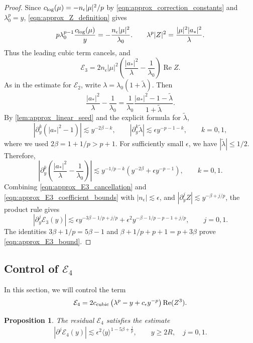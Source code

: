 \documentclass[11pt]{amsart}
\newtheorem{proposition}[theorem]{Proposition}
\theoremstyle{definition}
\theoremstyle{remark}
\numberwithin{equation}{section}
\newcommand{\sq}[1]{\widetilde{#1}}
\newcommand{\mc}[1]{\mathcal{#1}}
\newcommand{\ang}[1]{\langle #1 \rangle}
\begin{document}
\begin{proof}
    Since $c_{\textup{log}}(\mu)=-n_\epsilon|\mu|^2/p$ by \eqref{eqn:approx_correction_constants} and $\lambda_0^p=y$, \eqref{eqn:approx_Z_definition} gives
    \[p\lambda_0^{p-1}\frac{c_{\textup{log}}(\mu)}{y}
      =-\frac{n_\epsilon|\mu|^2}{\lambda_0}.
      \qquad
      \lambda^p|Z|^2=\frac{|\mu|^2|a_*|^2}{\lambda}.\]
    Thus the leading cubic term cancels, and
    \begin{equation}\label{eqn:approx_E3_cancellation}
        \mc{E}_3=2n_\epsilon|\mu|^2
        \left(\frac{|a_*|^2}{\lambda}-\frac{1}{\lambda_0}\right)
        \operatorname{Re}Z.
    \end{equation}
    As in the estimate for $\mc{E}_2$, write $\lambda=\lambda_0(1+\sq{\lambda})$. Then
    \[\frac{|a_*|^2}{\lambda}-\frac{1}{\lambda_0}
      =\frac{1}{\lambda_0}\frac{|a_*|^2-1-\sq{\lambda}}{1+\sq{\lambda}}.\]
    By \cref{lem:approx_linear_seed} and the explicit formula for $\sq{\lambda}$,
    \[|\partial_y^k(|a_*|^2-1)|\lesssim y^{-2\beta-k},\qquad
      |\partial_y^k\sq{\lambda}|\lesssim\epsilon y^{-p-1-k},\qquad k=0,1,\]
    where we used $2\beta=1+1/p>p+1$. For sufficiently small $\epsilon$, we have $|\sq{\lambda}|\leq1/2$. Therefore,
    \begin{equation}\label{eqn:approx_E3_coefficient_bounds}
        \left|\partial_y^k\left(\frac{|a_*|^2}{\lambda}-\frac{1}{\lambda_0}\right)\right|
        \lesssim y^{-1/p-k}\left(y^{-2\beta}+\epsilon y^{-p-1}\right),
        \qquad k=0,1.
    \end{equation}
    Combining \eqref{eqn:approx_E3_cancellation} and \eqref{eqn:approx_E3_coefficient_bounds} with $|n_\epsilon|\lesssim\epsilon$, and $|\partial_y^jZ|\lesssim y^{-\beta+j/p}$, the product rule gives
    \[|\partial_y^j\mc{E}_3(y)|
      \lesssim\epsilon y^{-3\beta-1/p+j/p}
      +\epsilon^2y^{-\beta-1/p-p-1+j/p},\qquad j=0,1.\]
    The identities $3\beta+1/p=5\beta-1$ and $\beta+1/p+p+1=p+3\beta$ prove \eqref{eqn:approx_E3_bound}.
\end{proof}

\subsection{Control of \texorpdfstring{$\mc{E}_4$}{E4}}

In this section, we will control the term
\[\mc{E}_4=2c_{\textup{cubic}}\left(\lambda^p-y+c_\epsilon y^{-p}\right)\operatorname{Re}(Z^3).\]
\begin{proposition}\label{prop:approx_E4}
    The residual $\mc{E}_4$ satisfies the estimate
    \begin{equation}\label{eqn:approx_E4_bound}
        |\partial^j\mc{E}_4(y)|
        \lesssim\epsilon^2\ang{y}^{1-5\beta+\frac{j}{p}},
        \qquad y\geq2R,\quad j=0,1.
    \end{equation}
\end{proposition}
\end{document}
